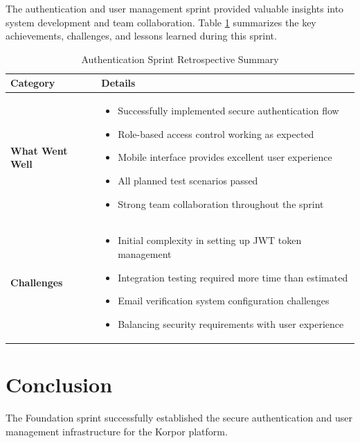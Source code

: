 The authentication and user management sprint provided valuable insights into system development and team collaboration. Table \ref{tab:auth-retrospective} summarizes the key achievements, challenges, and lessons learned during this sprint.
\begin{table}[htbp]
    \centering
    \begin{tabular}{|p{3cm}|p{10cm}|}
        \hline
        \textbf{Category} & \textbf{Details} \\
        \hline
        \textbf{What Went Well} & 
        \begin{itemize}
            \item Successfully implemented secure authentication flow
            \item Role-based access control working as expected
            \item Mobile interface provides excellent user experience
            \item All planned test scenarios passed
            \item Strong team collaboration throughout the sprint
        \end{itemize} \\
        \hline
        \textbf{Challenges} & 
        \begin{itemize}
            \item Initial complexity in setting up JWT token management
            \item Integration testing required more time than estimated
            \item Email verification system configuration challenges
            \item Balancing security requirements with user experience
        \end{itemize} \\
        \hline
    \end{tabular}
    \caption{Authentication Sprint Retrospective Summary}
    \label{tab:auth-retrospective}
\end{table}

\section*{Conclusion}

The Foundation sprint successfully established the secure authentication and user management infrastructure for the Korpor platform.

